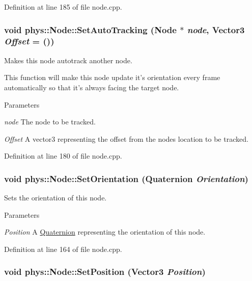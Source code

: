 Definition at line 185 of file node.cpp.

\hypertarget{classphys_1_1Node_a0e652a52ea7d6e18280d1fc4b283c86a}{
\subsubsection[{SetAutoTracking}]{\setlength{\rightskip}{0pt plus 5cm}void phys::Node::SetAutoTracking ({\bf Node} $\ast$ {\em node}, \/  {\bf Vector3} {\em Offset} = {()})}}
\label{d0/ddc/classphys_1_1Node_a0e652a52ea7d6e18280d1fc4b283c86a}


Makes this node autotrack another node. 

This function will make this node update it's orientation every frame automatically so that it's always facing the target node. 
\begin{DoxyParams}{Parameters}
\item[{\em node}]The node to be tracked. \item[{\em Offset}]A vector3 representing the offset from the nodes location to be tracked. \end{DoxyParams}


Definition at line 180 of file node.cpp.

\hypertarget{classphys_1_1Node_a3799cc7b685a4bbbb16b6f9b917824a8}{
\subsubsection[{SetOrientation}]{\setlength{\rightskip}{0pt plus 5cm}void phys::Node::SetOrientation ({\bf Quaternion} {\em Orientation})}}
\label{d0/ddc/classphys_1_1Node_a3799cc7b685a4bbbb16b6f9b917824a8}


Sets the orientation of this node. 


\begin{DoxyParams}{Parameters}
\item[{\em Position}]A \hyperlink{classphys_1_1Quaternion}{Quaternion} representing the orientation of this node. \end{DoxyParams}


Definition at line 164 of file node.cpp.

\hypertarget{classphys_1_1Node_ab8dc3aa58292b0156e67dc3684099bbe}{
\subsubsection[{SetPosition}]{\setlength{\rightskip}{0pt plus 5cm}void phys::Node::SetPosition ({\bf Vector3} {\em Position})}}
\label{d0/ddc/classphys_1_1Node_ab8dc3aa58292b0156e67dc3684099bbe}


